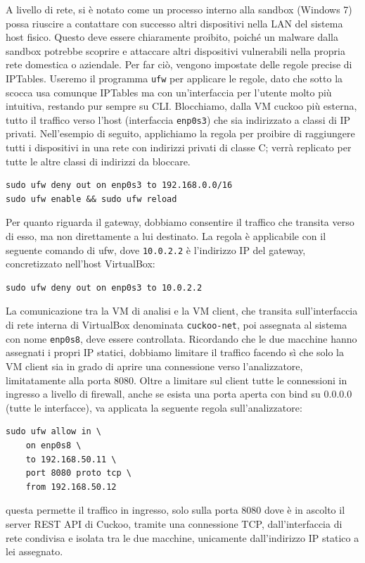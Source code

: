 A livello di rete, si è notato come un processo interno alla sandbox (Windows 7) possa riuscire a contattare con successo altri dispositivi nella LAN del sistema host fisico. Questo deve essere chiaramente proibito, poiché un malware dalla sandbox potrebbe scoprire e attaccare altri dispositivi vulnerabili nella propria rete domestica o aziendale.
Per far ciò, vengono impostate delle regole precise di IPTables. Useremo il programma \texttt{ufw} per applicare le regole, dato che sotto la scocca usa comunque IPTables ma con un'interfaccia per l'utente molto più intuitiva, restando pur sempre su CLI.
Blocchiamo, dalla VM cuckoo più esterna, tutto il traffico verso l'host (interfaccia \texttt{enp0s3}) che sia indirizzato a classi di IP privati. Nell'esempio di seguito, applichiamo la regola per proibire di raggiungere tutti i dispositivi in una rete con indirizzi privati di classe C; verrà replicato per tutte le altre classi di indirizzi da bloccare.

\begin{verbatim}
sudo ufw deny out on enp0s3 to 192.168.0.0/16
sudo ufw enable && sudo ufw reload
\end{verbatim}

Per quanto riguarda il gateway, dobbiamo consentire il traffico che transita verso di esso, ma non direttamente a lui destinato. La regola è applicabile con il seguente comando di ufw, dove \texttt{10.0.2.2} è l'indirizzo IP del gateway, concretizzato nell'host VirtualBox:

\begin{verbatim}
sudo ufw deny out on enp0s3 to 10.0.2.2
\end{verbatim}

La comunicazione tra la VM di analisi e la VM client, che transita sull'interfaccia di rete interna di VirtualBox denominata \texttt{cuckoo-net}, poi assegnata al sistema con nome \texttt{enp0s8}, deve essere controllata.
Ricordando che le due macchine hanno assegnati i propri IP statici, dobbiamo limitare il traffico facendo sì che solo la VM client sia in grado di aprire una connessione verso l'analizzatore, limitatamente alla porta 8080. Oltre a limitare sul client tutte le connessioni in ingresso a livello di firewall, anche se esista una porta aperta con bind su 0.0.0.0 (tutte le interfacce), va applicata la seguente regola sull'analizzatore:
\begin{verbatim}
sudo ufw allow in \
    on enp0s8 \
    to 192.168.50.11 \
    port 8080 proto tcp \
    from 192.168.50.12
\end{verbatim}
questa permette il traffico in ingresso, solo sulla porta 8080 dove è in ascolto il server REST API di Cuckoo, tramite una connessione TCP, dall'interfaccia di rete condivisa e isolata tra le due macchine, unicamente dall'indirizzo IP statico a lei assegnato.

